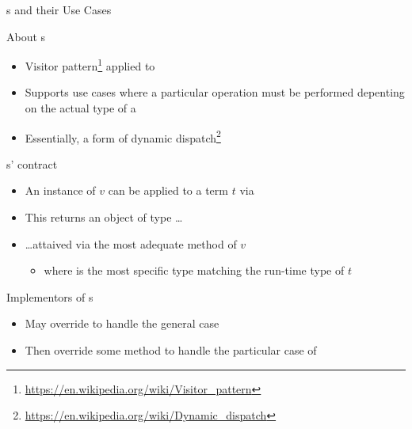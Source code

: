\documentclass[handout]{beamer}
\begin{document}
\begin{frame}[allowframebreaks]{s and their Use Cases}
    \begin{block}{About s}
        \begin{itemize}
            \item Visitor pattern\footnote{\url{https://en.wikipedia.org/wiki/Visitor_pattern}} applied to 
            \item Supports use cases where a particular operation must be performed depenting on the actual type of a 
            \item Essentially, a form of \alert{dynamic dispatch}\footnote{\url{https://en.wikipedia.org/wiki/Dynamic_dispatch}}
        \end{itemize}
    \end{block}


    \begin{block}{s' contract}
        \begin{itemize}
            \item An instance of  $v$ can be applied to a term $t$ via
            \begin{center}
            \end{center}

            \item This returns an object of type  \ldots

            \item \ldots attaived via the most adequate method  of $v$
            \begin{itemize}
                \item where  is the most specific type matching the run-time type of $t$
            \end{itemize}
        \end{itemize}
    \end{block}

    \begin{block}{Implementors of s}
        \begin{itemize}
            \item May override  to handle the general case
            \item Then override some  method to handle the particular case of 
        \end{itemize}
    \end{block}

\end{frame}
\end{document}
